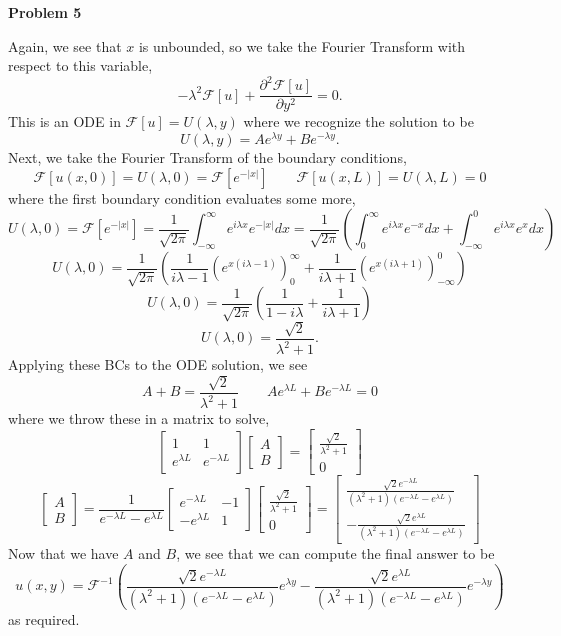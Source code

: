 \documentclass[10pt]{article}
\newcommand{\fo}{\mathcal{F}}
\begin{document}
\newpage
\textbf{Problem 5}

Again, we see that $x$ is unbounded, so we take the Fourier Transform with respect to this variable,
$$-\lambda^{2}\fo[u] + \frac{\partial^{2}\fo[u]}{\partial y^{2}} = 0.$$
This is an ODE in $\fo[u] = U(\lambda,y)$ where we recognize the solution to be
$$U(\lambda, y) = Ae^{\lambda y} + Be^{-\lambda y}.$$
Next, we take the Fourier Transform of the boundary conditions,
$$\fo[u(x,0)] = U(\lambda, 0) = \fo[e^{-|x|}] \hspace{2em} \fo[u(x,L)] = U(\lambda, L) = 0$$
where the first boundary condition evaluates some more,
$$U(\lambda, 0) = \fo[e^{-|x|}] = \frac{1}{\sqrt{2\pi}}\int_{-\infty}^{\infty}e^{i\lambda x}e^{-|x|}dx =\frac{1}{\sqrt{2\pi}}\left(\int_{0}^{\infty}e^{i\lambda x}e^{-x}dx + \int_{-\infty}^{0}e^{i\lambda x}e^{x}dx\right)$$
$$U(\lambda,0) = \frac{1}{\sqrt{2\pi}}\left(\frac{1}{i\lambda - 1}\left(e^{x(i\lambda - 1)}\right)_{0}^{\infty} + \frac{1}{i\lambda + 1}\left(e^{x(i\lambda + 1)}\right)_{-\infty}^{0}\right)$$
$$U(\lambda,0) = \frac{1}{\sqrt{2\pi}}\left(\frac{1}{1-i\lambda} + \frac{1}{i\lambda + 1}\right)$$
$$U(\lambda,0) = \frac{\sqrt{2}}{\lambda^{2} + 1}.$$
Applying these BCs to the ODE solution, we see
$$A+B = \frac{\sqrt{2}}{\lambda^{2} + 1} \hspace{2em} Ae^{\lambda L} + Be^{-\lambda L} = 0$$
where we throw these in a matrix to solve,
\[
  \begin{bmatrix}
    1 & 1 \\
    e^{\lambda L} & e^{-\lambda L}
  \end{bmatrix}
  \begin{bmatrix}
    A \\
    B
  \end{bmatrix}
  =
  \begin{bmatrix}
    \frac{\sqrt{2}}{\lambda^{2} + 1} \\
    0
  \end{bmatrix}
\]
\[
  \begin{bmatrix}
    A \\
    B
  \end{bmatrix}
  =
  \frac{1}{e^{-\lambda L} - e^{\lambda L}}
  \begin{bmatrix}
    e^{-\lambda L} & -1 \\
    -e^{\lambda L} & 1
  \end{bmatrix}
  \begin{bmatrix}
    \frac{\sqrt{2}}{\lambda^{2} + 1} \\
    0
  \end{bmatrix}
  =
  \begin{bmatrix}
    \frac{\sqrt{2}e^{-\lambda L}}{(\lambda^{2} + 1)(e^{-\lambda L} - e^{\lambda L})} \\
    -\frac{\sqrt{2}e^{\lambda L}}{(\lambda^{2} + 1)(e^{-\lambda L} - e^{\lambda L})}
  \end{bmatrix}
\]
Now that we have $A$ and $B$, we see that we can compute the final answer to be
$$u(x,y) = \fo^{-1}\left(\frac{\sqrt{2}e^{-\lambda L}}{(\lambda^{2} + 1)(e^{-\lambda L} - e^{\lambda L})}e^{\lambda y} -\frac{\sqrt{2}e^{\lambda L}}{(\lambda^{2} + 1)(e^{-\lambda L} - e^{\lambda L})}e^{-\lambda y}\right)$$
as required.
\end{document}
